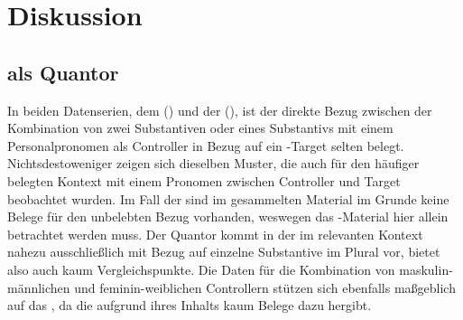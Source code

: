 \chapter{Diskussion}
\label{ch:diskussion}


\section{ als Quantor}


In beiden Datenserien, dem  (\CAO{}) und der
 (\citet{kc}), ist der direkte Bezug zwischen der Kombination von
zwei Substantiven oder eines Substantivs mit einem Personalpronomen als
Controller in Bezug auf ein -Target selten belegt.
Nichtsdestoweniger zeigen sich dieselben Muster, die auch für den häufiger
belegten Kontext mit einem Pronomen zwischen Controller und Target beobachtet
wurden. Im Fall der \citet{kc} sind im gesammelten Material im Grunde keine
Belege für den unbelebten Bezug vorhanden, weswegen das
\CAO{}-Material hier allein betrachtet werden muss. Der Quantor
  \autocite[vgl.][606--621]{ksw2} kommt in der \citet{kc}
im relevanten Kontext nahezu ausschließlich mit Bezug auf einzelne
Substan\-tive im Plural vor, bietet also auch kaum Vergleichspunkte. Die Daten
für die Kombination von maskulin-männlichen und feminin-weiblichen Controllern
stützen sich ebenfalls maßgeblich auf das \CAO{}, da die \citet{kc}
aufgrund ihres Inhalts kaum Belege dazu hergibt.


